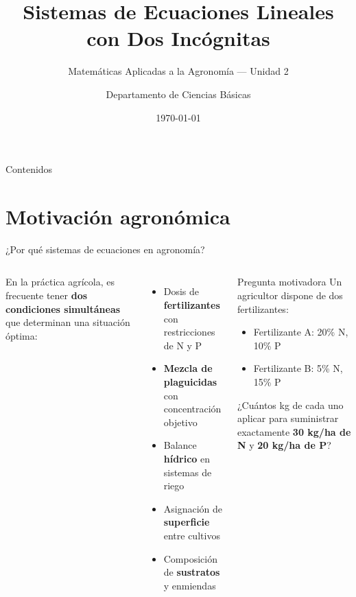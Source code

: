 \documentclass[11pt, aspectratio=169]{beamer}
\title[Sistemas Lineales — Agronomía]{Sistemas de Ecuaciones Lineales\\con Dos Incógnitas}
\subtitle{Matemáticas Aplicadas a la Agronomía — Unidad 2}
\author[Dept. Ciencias Básicas]{Departamento de Ciencias Básicas}
\institute{Facultad de Agronomía}
\date{\today}
\begin{document}
	
	\begin{frame}[plain]
		\titlepage
	\end{frame}
	
	\begin{frame}{Contenidos}
		\tableofcontents
	\end{frame}
	
	\section{Motivación agronómica}
	
	\begin{frame}{¿Por qué sistemas de ecuaciones en agronomía?}
		\begin{columns}[T]
			En la práctica agrícola, es frecuente tener \textbf{dos condiciones simultáneas}
			que determinan una situación óptima:
			\begin{itemize}
				\item Dosis de \textbf{fertilizantes} con restricciones de N y P
				\item \textbf{Mezcla de plaguicidas} con concentración objetivo
				\item Balance \textbf{hídrico} en sistemas de riego
				\item Asignación de \textbf{superficie} entre cultivos
				\item Composición de \textbf{sustratos} y enmiendas
			\end{itemize}
			\begin{exampleblock}{Pregunta motivadora}
				Un agricultor dispone de dos fertilizantes:
				\begin{itemize}
					\item Fertilizante A: 20\% N, 10\% P
					\item Fertilizante B: 5\% N, 15\% P
				\end{itemize}
				¿Cuántos kg de cada uno aplicar para suministrar exactamente
				\textbf{30 kg/ha de N} y \textbf{20 kg/ha de P}?
			\end{exampleblock}
		\end{columns}
	\end{frame}
	
\end{document}
